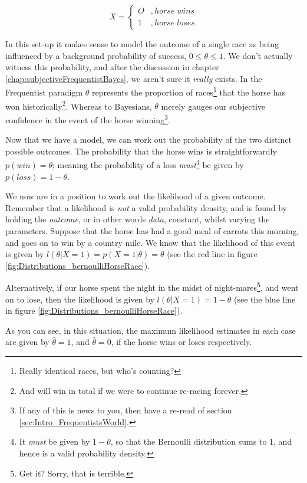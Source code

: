 \documentclass[11pt,fullpage]{book}
\begin{document}
\begin{equation}
X =
\begin{cases}
O & , horse\; wins \\
1 & , horse\; loses
\end{cases}
\end{equation}

In this set-up it makes sense to model the outcome of a single race as being influenced by a background probability of success, $0\leq\theta\leq 1$. We don't actually witness this probability, and after the discussion in chapter \ref{chap:subjectiveFrequentistBayes}, we aren't sure it \textit{really} exists. In the Frequentist paradigm $\theta$ represents the proportion of races\footnote{Really identical races, but who's counting?} that the horse has won historically\footnote{And will win in total if we were to continue re-racing forever.}. Whereas to Bayesians, $\theta$ merely gauges our subjective confidence in the event of the horse winning\footnote{If any of this is news to you, then have a re-read of section \ref{sec:Intro_FrequentistsWorld}.}.

Now that we have a model, we can work out the probability of the two distinct possible outcomes. The probability that the horse wins is straightforwardly $p(win)=\theta$; meaning the probability of a loss \textit{must}\footnote{It \textit{must} be given by $1-\theta$, so that the Bernoulli distribution sums to 1, and hence is a valid probability density.} be given by $p(loss)=1-\theta$.

We now are in a position to work out the likelihood of a given outcome. Remember that a likelihood is \textit{not} a valid probability density, and is found by holding the \textit{outcome}, or in other words \textit{data}, constant, whilst varying the parameters. Suppose that the horse has had a good meal of carrots this morning, and goes on to win by a country mile. We know that the likelihood of this event is given by $l(\theta|X=1)=p(X=1|\theta)=\theta$ (see the red line in figure \ref{fig:Distributions_bernoulliHorseRace}).

Alternatively, if our horse spent the night in the midst of night-mares\footnote{Get it? Sorry, that is terrible.}, and went on to lose, then the likelihood is given by $l(\theta|X=1)=1-\theta$ (see the blue line in figure \ref{fig:Distributions_bernoulliHorseRace}).

As you can see, in this situation, the maximum likelihood estimates in each case are given by $\hat{\theta}=1$, and $\hat{\theta}=0$, if the horse wins or loses respectively.
\end{document}

